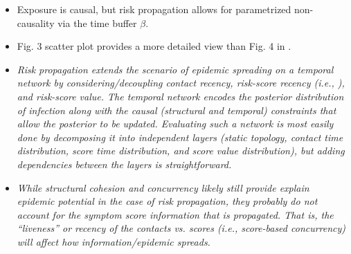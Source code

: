 \begin{itemize}
\begin{itemize}
        \item Exposure is causal, but risk propagation allows for parametrized non-causality via the time buffer $\beta$.
        \item Fig. 3 scatter plot provides a more detailed view than Fig. 4 in \cite{Lee2019b}.
        \item \emph{Risk propagation extends the scenario of epidemic spreading on a temporal network by considering/decoupling contact recency, risk-score recency (i.e., ), and risk-score value. The temporal network encodes the posterior distribution of infection along with the causal (structural and temporal) constraints that allow the posterior to be updated. Evaluating such a network is most easily done by decomposing it into independent layers (static topology, contact time distribution, score time distribution, and score value distribution), but adding dependencies between the layers is straightforward.}
        \item \emph{While structural cohesion and concurrency likely still provide explain epidemic potential in the case of risk propagation, they probably do not account for the symptom score information that is propagated. That is, the ``liveness'' or recency of the contacts vs. scores (i.e., score-based concurrency) will affect how information/epidemic spreads.}
    \end{itemize}
\end{itemize}